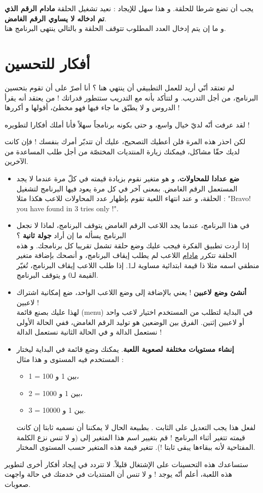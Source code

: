 يجب أن تضع شرطا للحلقة. و هذا سهل للإيجاد : نعيد تشغيل الحلقة 
\textbf{مادام الرقم الذي تم ادخاله لا يساوي الرقم الغامض}.\\
و ما إن يتم إدخال العدد المطلوب تتوقف الحلقة و بالتالي ينتهى البرنامج هنا.

\section{أفكار للتحسين}

لم تعتقد أنّي أريد للعمل التطبيقي أن ينتهي هنا ؟ أنا أصرّ على أن تقوم بتحسين البرنامج، من أجل التدريب. و لتتأكد بأنه مع التدريب ستتطور قدراتك ! من يعتقد أنه يقرأ الدروس و لا يطبّق ما جاء فيها فهو مخطئ، أقولها و أكررها !

لقد عرفت أنّه لديّ خيال واسع، و حتى بكونه برنامجاً سهلاً فأنا أملك أفكارا لتطويره !

لكن احذر هذه المرة فلن أعطيك التصحيح، عليك أن تتدبّر أمرك بنفسك ! فإن كانت لديك حقّا مشاكل، فيمكنك زيارة المنتديات المختصّة من أجل طلب المساعدة من الآخرين.

\begin{itemize}
	\item \textbf{ضع عدادا للمحاولات}،
	و هو متغير نقوم بزيادة قيمته في كلّ مرة عندما لا يجد المستعمل الرقم الغامض. بمعنى آخر في كل مرة يعود فيها البرنامج لتشغيل الحلقة، و عند انتهاء اللعبة تقوم بإظهار عدد المحاولات للاعب هكذا مثلا :
	"\textenglish{Bravo! you have found in 3 tries only !}".
	\item في هذا البرنامج، عندما يجد اللاعب الرقم الغامض يتوقف البرنامج، لماذا لا نجعل البرنامج يسأله ما إن أراد 
	\textbf{جولة ثانية} ؟\\
	إذا أردت تطبيق الفكرة فيجب عليك وضع حلقة تشمل تقريبا كل برنامجك. و هذه الحلقة تتكرر 
	\underline{مادام}
	اللاعب لم يطلب إيقاف البرنامج، و أنصحك بإضافة متغير منطقي اسمه مثلا
ذا قيمة ابتدائية مساوية لـ1. إذا طلب اللاعب إيقاف البرنامج، تُغيّر القيمة لـ0 و يتوقف البرنامج.
	\item \textbf{أنشئ وضع لاعبين} !
	 يعني بالإضافة إلى وضع اللاعب الواحد، ضع إمكانية اشتراك لاعبين !\\
	 لهذا عليك بصنع قائمة
	 (\textenglish{menu})
	 في البداية لتطلب من المستخدم اختيار لاعب واحد أو لاعبين إثنين. الفرق بين الوضعين هو توليد الرقم الغامض، ففي الحالة الأولى نستعمل الدالة 
	 و في الحالة الثانية نستعمل الدالة
	  !
	 \item \textbf{إنشاء مستويات مختلفة لصعوبة اللعبة}.
	  يمكنك وضع قائمة في البداية ليختار المستخدم فيه المستوى و هذا مثال :
	 \begin{itemize}
	 	\item 1 = بين 1 و 100،
	 	\item 2 = بين 1 و 1000،
	 	\item 3 = بين 1 و 10000.
	 \end{itemize}
 لفعل هذا يجب التعديل على الثابت
 .
 بطبيعة الحال لا يمكننا أن نسميه ثابتا إن كانت قيمته تتغير أثناء البرنامج ! قم بتغيير اسم هذا المتغير إلى 
 (و لا تنس نزع الكلمة المفتاحية 
 لأنه ببقاءها يبقى ثابتا !). تتغير قيمة هذه المتغير حسب المستوى المختار.
\end{itemize}

ستساعدك هذه التحسينات على الإشتغال قليلاً. لا تتردد في إيجاد أفكار أخرى لتطوير هذه اللعبة، أعلم أنّه يوجد ! و لا تنس أن المنتديات في خدمتك في حالة واجهت صعوبات.
